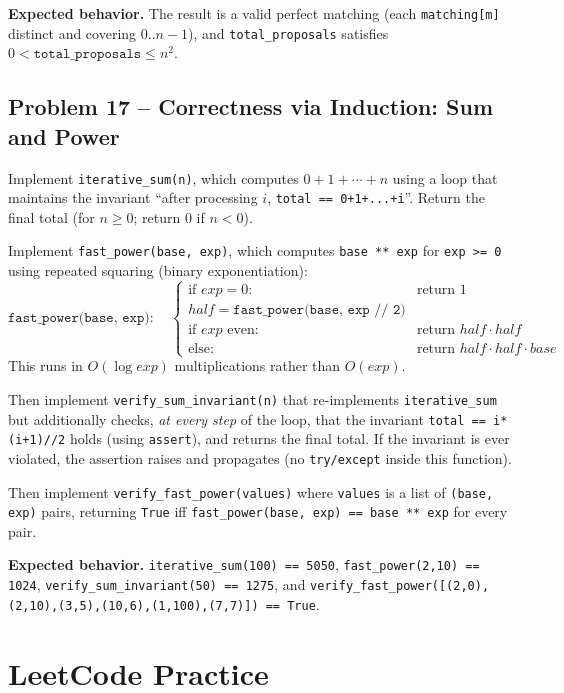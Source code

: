 \documentclass[11pt]{article}
\begin{document}
\textbf{Expected behavior.} The result is a valid perfect matching (each
\texttt{matching[m]} distinct and covering $0..n-1$), and \texttt{total\_proposals}
satisfies $0 < \texttt{total\_proposals} \le n^2$.

\subsection*{Problem 17 -- Correctness via Induction: Sum and Power}

Implement \texttt{iterative\_sum(n)}, which computes $0+1+\cdots+n$ using a loop that
maintains the invariant ``after processing $i$, \texttt{total == 0+1+...+i}''. Return the
final total (for $n \ge 0$; return $0$ if $n<0$).

Implement \texttt{fast\_power(base, exp)}, which computes \texttt{base ** exp} for
\texttt{exp >= 0} using repeated squaring (binary exponentiation):
\[
\texttt{fast\_power(base, exp)}: \quad
\begin{cases}
\text{if } exp = 0: & \text{return } 1 \\
half = \texttt{fast\_power(base, exp // 2)} & \\
\text{if } exp \text{ even}: & \text{return } half \cdot half \\
\text{else}: & \text{return } half \cdot half \cdot base
\end{cases}
\]
This runs in $O(\log exp)$ multiplications rather than $O(exp)$.

Then implement \texttt{verify\_sum\_invariant(n)} that re-implements
\texttt{iterative\_sum} but additionally checks, \emph{at every step} of the loop, that the
invariant \texttt{total == i*(i+1)//2} holds (using \texttt{assert}), and returns the final
total. If the invariant is ever violated, the assertion raises and propagates (no
\texttt{try/except} inside this function).

Then implement \texttt{verify\_fast\_power(values)} where \texttt{values} is a list of
\texttt{(base, exp)} pairs, returning \texttt{True} iff \texttt{fast\_power(base, exp) ==
base ** exp} for every pair.

\textbf{Expected behavior.} \texttt{iterative\_sum(100) == 5050},
\texttt{fast\_power(2,10) == 1024}, \texttt{verify\_sum\_invariant(50) == 1275}, and
\texttt{verify\_fast\_power([(2,0),(2,10),(3,5),(10,6),(1,100),(7,7)]) == True}.

\newpage
\section{LeetCode Practice}
\end{document}
